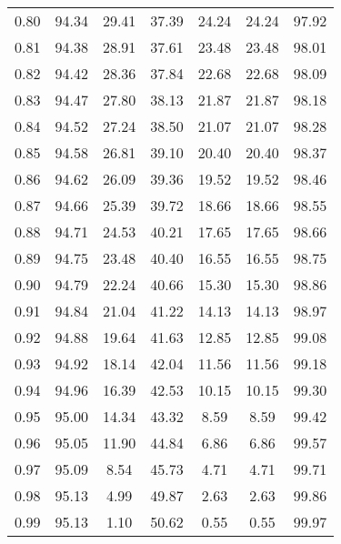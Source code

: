 \begin{tabular}{|c|c|c|c|c|c|c|}
      0.80 &     94.34 &     29.41 &      37.39 &   24.24 &      24.24 &         97.92 \\
      0.81 &     94.38 &     28.91 &      37.61 &   23.48 &      23.48 &         98.01 \\
      0.82 &     94.42 &     28.36 &      37.84 &   22.68 &      22.68 &         98.09 \\
      0.83 &     94.47 &     27.80 &      38.13 &   21.87 &      21.87 &         98.18 \\
      0.84 &     94.52 &     27.24 &      38.50 &   21.07 &      21.07 &         98.28 \\
      0.85 &     94.58 &     26.81 &      39.10 &   20.40 &      20.40 &         98.37 \\
      0.86 &     94.62 &     26.09 &      39.36 &   19.52 &      19.52 &         98.46 \\
      0.87 &     94.66 &     25.39 &      39.72 &   18.66 &      18.66 &         98.55 \\
      0.88 &     94.71 &     24.53 &      40.21 &   17.65 &      17.65 &         98.66 \\
      0.89 &     94.75 &     23.48 &      40.40 &   16.55 &      16.55 &         98.75 \\
      0.90 &     94.79 &     22.24 &      40.66 &   15.30 &      15.30 &         98.86 \\
      0.91 &     94.84 &     21.04 &      41.22 &   14.13 &      14.13 &         98.97 \\
      0.92 &     94.88 &     19.64 &      41.63 &   12.85 &      12.85 &         99.08 \\
      0.93 &     94.92 &     18.14 &      42.04 &   11.56 &      11.56 &         99.18 \\
      0.94 &     94.96 &     16.39 &      42.53 &   10.15 &      10.15 &         99.30 \\
      0.95 &     95.00 &     14.34 &      43.32 &    8.59 &       8.59 &         99.42 \\
      0.96 &     95.05 &     11.90 &      44.84 &    6.86 &       6.86 &         99.57 \\
      0.97 &     95.09 &      8.54 &      45.73 &    4.71 &       4.71 &         99.71 \\
      0.98 &     95.13 &      4.99 &      49.87 &    2.63 &       2.63 &         99.86 \\
      0.99 &     95.13 &      1.10 &      50.62 &    0.55 &       0.55 &         99.97 \\
\bottomrule
\end{tabular}
